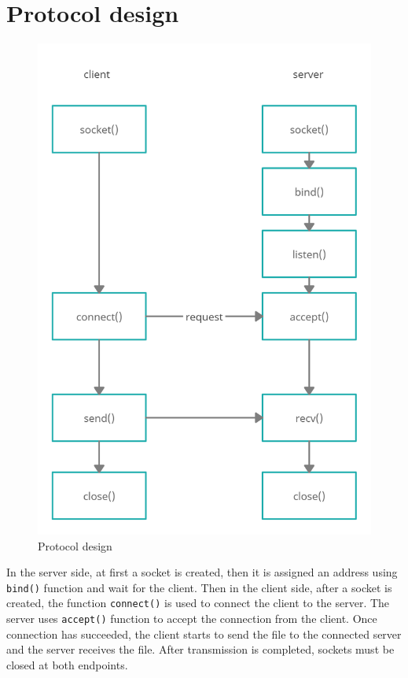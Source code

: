 \documentclass[times, 10pt]{thesisMDH}
\begin{document}
\titlePage

\newpage

\mainmatter

\section{Protocol design}
\begin{figure}[H]
    \centering
    \includegraphics[width = 0.7\linewidth]{images/1-1.png}
    \caption{Protocol design}
\end{figure}
In the server side, at first a socket is created, then it is assigned an address using \texttt{bind()} function and wait for the client. Then in the client side, after a socket is created, the function \texttt{connect()} is used to connect the client to the server. The server uses \texttt{accept()} function to accept the connection from the client. Once connection has succeeded, the client starts to send the file to the connected server and the server receives the file. After transmission is completed, sockets must be closed at both endpoints.
\end{document}
